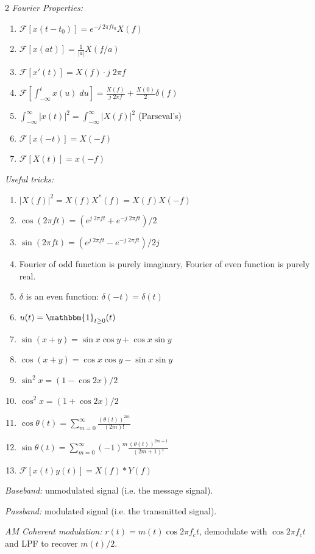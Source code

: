 \documentclass[9pt]{article}
\newcommand{\ind}{\mathbbm{1}}
\newcommand{\abs}[1]{\left\vert #1 \right\vert}
\newcommand{\F}{\mathcal{F}}
\begin{document}
\begin{multicols}{2}
\emph{Fourier Properties:}
\begin{enumerate}
    \item $\F[x(t - t_0)] = e^{-j\; 2\pi f t_0} X(f)$
    \item $\F[x(at)] = \frac{1}{\abs a}X(f/a)$
    \item $\F[x'(t)] = X(f) \cdot j\; 2\pi f$
    \item $\F[\int_{-\infty}^t x(u)\; du] = \frac{X(f)}{j\; 2\pi f} + \frac{X(0)}{2} \delta(f)$
    \item $\int_{-\infty}^{\infty} \abs{x(t)}^2 = \int_{-\infty}^{\infty} \abs{X(f)}^2$ (Parseval's)
    \item $\F[x(-t)] = X(-f)$
    \item $\F[X(t)] = x(-f)$  
\end{enumerate}

\emph{Useful tricks:}
\begin{enumerate}
    \item $\abs{X(f)}^2 = X(f) X^*(f) = X(f) X(-f)$
    \item $\cos(2\pi f t) = (e^{j\; 2\pi f t} + e^{-j\; 2\pi f t})/2$
    \item $\sin(2\pi f t) = (e^{j\; 2\pi f t} - e^{-j\; 2\pi f t})/2j$
    \item Fourier of odd function is purely imaginary, Fourier of even function is purely real.
    \item $\delta$ is an even function: $\delta(-t) = \delta(t)$
    \item $u(t) = \ind_{t \geq 0}(t)$ 
    \item $\sin(x + y) = \sin x \cos y + \cos x \sin y$
    \item $\cos(x + y) = \cos x \cos y - \sin x \sin y$
    \item $\sin^2 x = (1 - \cos 2 x)/2$
    \item $\cos^2 x = (1 + \cos 2x)/ 2$
    \item $\cos \theta(t) = \sum_{m=0}^{\infty} \frac{(\theta(t))^{2m}}{(2m)!}$
    \item $\sin \theta(t) = \sum_{m=0}^{\infty} (-1)^m \frac{(\theta(t))^{2m+1}}{(2m + 1)!}$
    \item $\F[x(t)y(t)] = X(f) * Y(f)$
\end{enumerate}

\emph{Baseband:} unmodulated signal (i.e. the message signal).

\emph{Passband:} modulated signal (i.e. the transmitted signal).

\emph{AM Coherent modulation:} $r(t) = m(t) \cos 2\pi f_c t$, demodulate with $\cos 2\pi f_c t$ and LPF to recover $m(t)/2$.


\end{multicols}
\end{document}
